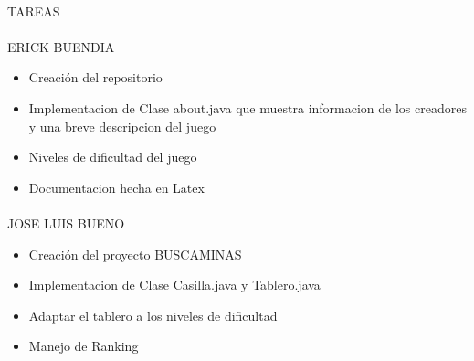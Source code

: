 \documentclass[../documentacion_buscaminas2013.tex]{subfiles}
\begin{document}
\paragraph{ }TAREAS

\paragraph{ } ERICK BUENDIA
\begin{itemize}
 \item Creación del repositorio
 \item Implementacion de Clase about.java que muestra informacion de los creadores y una breve descripcion del juego
 \item Niveles de dificultad del juego
 \item Documentacion hecha en Latex
\end{itemize}

\paragraph{ } JOSE LUIS BUENO
\begin{itemize}
 \item Creación del proyecto BUSCAMINAS
 \item Implementacion de Clase Casilla.java y Tablero.java
 \item Adaptar el tablero a los niveles de dificultad
 \item Manejo de Ranking
\end{itemize}

\clearpage
\end{document}
